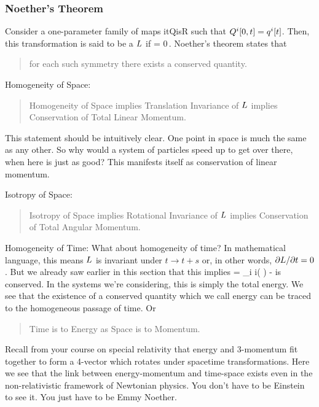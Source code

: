 \subsubsection{Noether's Theorem}
Consider a one-parameter family of maps
\beq
\gpos i\vat t\to\cnvec Qi\qquad{}\qquad s\in\set R
\eeq
such that ${Q}^{i}\!\left[{0,t}\right] = {q}^{i}\!\left[{t}\right]$. Then, this transformation is said to be a  $L$ if
\beq
{}\lag{} = 0\,.
\eeq
Noether's theorem states that 
\begin{quote}
for each such symmetry there exists a conserved quantity.
\end{quote}

Homogeneity of Space: 
\begin{quote}
Homogeneity of Space implies Translation Invariance of $L$ implies Conservation of Total Linear Momentum.
\end{quote}
This statement should be intuitively clear. One point in space is much the same as any other. So why would a system of particles speed up to get over there, when here is just as good? This manifests itself as conservation of linear momentum.

Isotropy of Space:
\begin{quote}
Isotropy of Space implies Rotational Invariance of $L$ implies Conservation of Total Angular Momentum.
\end{quote}

Homogeneity of Time: What about homogeneity of time? In mathematical language, this means $L$ is invariant under $t\to t + s$ or, in other words, $\partial L/\partial t = 0$. But we already saw earlier in this section that this implies 
\beq
\ham = \sum_i \gvel i\left(  \right) - \lag 
\eeq
is conserved. In the systems we’re considering, this is simply the total energy. We see that the existence of a conserved quantity which we call energy can be traced to the homogeneous passage of time. Or
\begin{quote}
Time is to Energy as Space is to Momentum.
\end{quote}
Recall from your course on special relativity that energy and 3-momentum fit together to form a 4-vector which rotates under spacetime transformations. Here we see that the link between energy-momentum and time-space exists even in the non-relativistic framework of Newtonian physics. You don't have to be Einstein to see it. You just have to be Emmy Noether.

